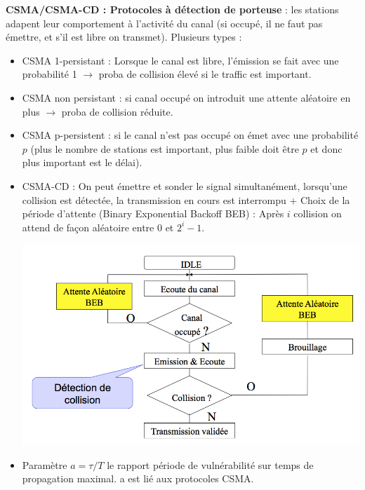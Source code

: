 \documentclass[a4paper,9pt, twocolumn]{article}
\begin{document}
\textbf{CSMA/CSMA-CD : Protocoles à détection de porteuse} : les stations adapent leur comportement à l'activité du canal (si occupé, il ne faut pas émettre, et s'il est libre on transmet). Plusieurs types :
\begin{itemize}
\item CSMA 1-persistant : Lorsque le canal est libre, l'émission se fait avec une probabilité 1 $\longrightarrow$ proba de collision élevé si le traffic est important.
\item CSMA non persistant : si canal occupé on introduit une attente aléatoire en plus $\longrightarrow$ proba de collision réduite.
\item CSMA p-persistent : si le canal n'est pas occupé on émet avec une probabilité $p$ (plus le nombre de stations est important, plus faible doit être $p$ et donc plus important est le délai).
\item CSMA-CD : On peut émettre et sonder le signal simultanément, lorsqu'une collision est détectée, la transmission en cours est interrompu + Choix de la période d'attente (Binary Exponential Backoff BEB) : Après $i$ collision on attend de façon aléatoire entre $0$ et $2^{i}-1$.

\includegraphics[scale=0.4]{CD.png}

\item Paramètre $a = \tau /T$ le rapport période de vulnérabilité sur temps de propagation maximal. a est lié aux protocoles CSMA.
\end{itemize}
\end{document}
